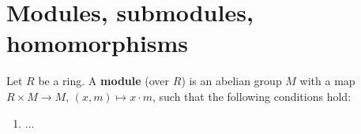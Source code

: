 \chapter{Modules, submodules, homomorphisms}

\begin{definition}
    Let $R$ be a ring. A \textbf{module} (over $R$) is an abelian group
    $M$ with a map $R\times M\to M$, $(x,m)\mapsto x\cdot m$, such that
    the following conditions hold:
    \begin{enumerate}
        \item ...
    \end{enumerate}
\end{definition}